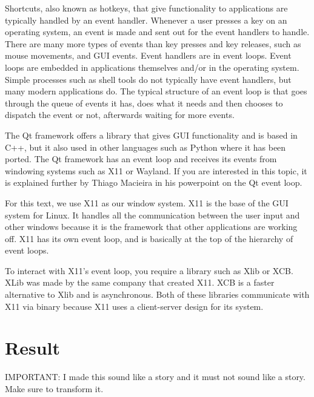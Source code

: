 \documentclass[12pt]{article}
\begin{document}
	
Shortcuts, also known as hotkeys, that give functionality to applications are typically handled by an event handler.
Whenever a user presses a key on an operating system, an event is made and sent out for the event handlers to handle.
There are many more types of events than key presses and key releases, such as mouse movements, and GUI events.
Event handlers are in event loops. Event loops are embedded in applications themselves and/or in the operating system. Simple processes such as shell tools do not typically have event handlers, but many modern applications do. The typical structure of an event loop is that goes through the queue of events it has, does what it needs and then chooses to dispatch the event or not, afterwards waiting for more events. 

The Qt framework offers a library that gives GUI functionality and is based in C++, but it also used in other languages such as Python where it has been ported.
The Qt framework has an event loop and receives its events from windowing systems such as X11 or Wayland.
If you are interested in this topic, it is explained further by Thiago Macieira in his powerpoint on the Qt event loop\cite{QtSlides}.

For this text, we use X11 as our window system.
X11 is the base of the GUI system for Linux.
It handles all the communication between the user input and other windows because it is the framework that other applications are working off.
X11 has its own event loop, and is basically at the top of the hierarchy of event loops.

To interact with X11's event loop, you require a library such as Xlib or XCB.
XLib was made by the same company that created X11.
XCB is a faster alternative to Xlib and is asynchronous.
Both of these libraries communicate with X11 via binary because X11 uses a client-server design for its system.


	
\section{Result}

IMPORTANT: I made this sound like a story and it must not sound like a story. Make sure to transform it.
\end{document}
